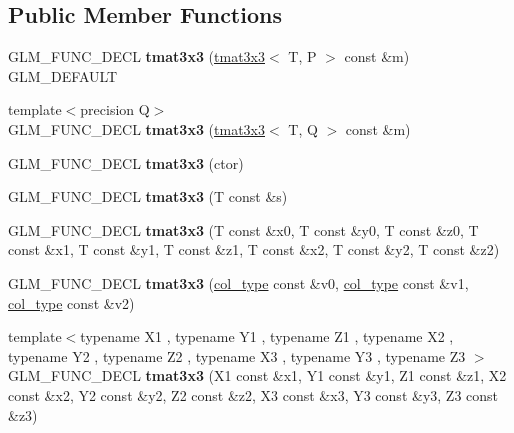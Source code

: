 \subsection*{Public Member Functions}
\begin{DoxyCompactItemize}
\item 
\hypertarget{structglm_1_1tmat3x3_a037368b5639421cbaeca2ecbe74dcadb}{G\-L\-M\-\_\-\-F\-U\-N\-C\-\_\-\-D\-E\-C\-L {\bfseries tmat3x3} (\hyperlink{structglm_1_1tmat3x3}{tmat3x3}$<$ T, P $>$ const \&m) G\-L\-M\-\_\-\-D\-E\-F\-A\-U\-L\-T}\label{structglm_1_1tmat3x3_a037368b5639421cbaeca2ecbe74dcadb}

\item 
\hypertarget{structglm_1_1tmat3x3_a8b70a7497b9dc3aba4c12a7fa847b265}{{\footnotesize template$<$precision Q$>$ }\\G\-L\-M\-\_\-\-F\-U\-N\-C\-\_\-\-D\-E\-C\-L {\bfseries tmat3x3} (\hyperlink{structglm_1_1tmat3x3}{tmat3x3}$<$ T, Q $>$ const \&m)}\label{structglm_1_1tmat3x3_a8b70a7497b9dc3aba4c12a7fa847b265}

\item 
\hypertarget{structglm_1_1tmat3x3_a67f53fc7d0534b7c91733cdf99f703df}{G\-L\-M\-\_\-\-F\-U\-N\-C\-\_\-\-D\-E\-C\-L {\bfseries tmat3x3} (ctor)}\label{structglm_1_1tmat3x3_a67f53fc7d0534b7c91733cdf99f703df}

\item 
\hypertarget{structglm_1_1tmat3x3_af2e19bcd31077abd4a97bf9eeba00443}{G\-L\-M\-\_\-\-F\-U\-N\-C\-\_\-\-D\-E\-C\-L {\bfseries tmat3x3} (T const \&s)}\label{structglm_1_1tmat3x3_af2e19bcd31077abd4a97bf9eeba00443}

\item 
\hypertarget{structglm_1_1tmat3x3_a5ff64909d75cb68a3b53ac3666870e35}{G\-L\-M\-\_\-\-F\-U\-N\-C\-\_\-\-D\-E\-C\-L {\bfseries tmat3x3} (T const \&x0, T const \&y0, T const \&z0, T const \&x1, T const \&y1, T const \&z1, T const \&x2, T const \&y2, T const \&z2)}\label{structglm_1_1tmat3x3_a5ff64909d75cb68a3b53ac3666870e35}

\item 
\hypertarget{structglm_1_1tmat3x3_a5d2dfab335082d3724dbe2333a1580a0}{G\-L\-M\-\_\-\-F\-U\-N\-C\-\_\-\-D\-E\-C\-L {\bfseries tmat3x3} (\hyperlink{structglm_1_1tvec3}{col\-\_\-type} const \&v0, \hyperlink{structglm_1_1tvec3}{col\-\_\-type} const \&v1, \hyperlink{structglm_1_1tvec3}{col\-\_\-type} const \&v2)}\label{structglm_1_1tmat3x3_a5d2dfab335082d3724dbe2333a1580a0}

\item 
\hypertarget{structglm_1_1tmat3x3_aec731c2a1a80db526b22323c3c41cc40}{{\footnotesize template$<$typename X1 , typename Y1 , typename Z1 , typename X2 , typename Y2 , typename Z2 , typename X3 , typename Y3 , typename Z3 $>$ }\\G\-L\-M\-\_\-\-F\-U\-N\-C\-\_\-\-D\-E\-C\-L {\bfseries tmat3x3} (X1 const \&x1, Y1 const \&y1, Z1 const \&z1, X2 const \&x2, Y2 const \&y2, Z2 const \&z2, X3 const \&x3, Y3 const \&y3, Z3 const \&z3)}\label{structglm_1_1tmat3x3_aec731c2a1a80db526b22323c3c41cc40}


\end{DoxyCompactItemize}
